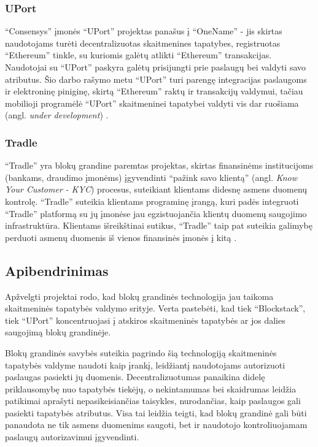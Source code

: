 \subsubsection{UPort}

\enquote{Consensys} įmonės \enquote{UPort} projektas panašus į \enquote{OneName} - jis skirtas naudotojams turėti decentralizuotas
skaitmenines tapatybes, registruotas \enquote{Ethereum} tinkle, su kuriomis galėtų atlikti \enquote{Ethereum} transakcijas.
Naudotojai su \enquote{UPort} paskyra
galėtų prisijungti prie paslaugų bei valdyti savo atributus. Šio darbo rašymo metu \enquote{UPort} turi
parengę integracijas paslaugoms ir elektroninę piniginę, skirtą \enquote{Ethereum} raktų
ir transakcijų valdymui, tačiau mobilioji programėlė \enquote{UPort} skaitmeninei tapatybei valdyti vis dar ruošiama (angl.
\textit{under development}) \cite{UPort}.

\subsubsection{Tradle}

\enquote{Tradle} yra blokų grandine paremtas projektas, skirtas finansinėms institucijoms (bankams,
draudimo įmonėms) įgyvendinti \enquote{pažink savo klientą} (angl. \textit{Know Your Customer - KYC}) procesus,
suteikiant klientams didesnę asmens duomenų kontrolę. \enquote{Tradle} suteikia
klientams programinę įrangą, kuri padės integruoti \enquote{Tradle} platformą su jų įmonėse jau egzistuojančia klientų duomenų saugojimo
infrastruktūra. Klientams išreikštinai sutikus, \enquote{Tradle} taip pat suteikia galimybę perduoti asmenų duomenis iš vienos
finansinės įmonės į kitą \cite{Baars2016}.

\subsection{Apibendrinimas}

Apžvelgti projektai rodo, kad blokų grandinės technologija jau taikoma skaitmeninės tapatybės valdymo srityje. Verta pastebėti,
kad tiek \enquote{Blockstack}, tiek \enquote{UPort} koncentruojasi į atskiros skaitmeninės tapatybės ar jos dalies saugojimą blokų grandinėje.

Blokų grandinės savybės suteikia pagrindo šią technologiją skaitmeninės tapatybės valdyme naudoti kaip įrankį,
leidžiantį naudotojams autorizuoti paslaugas pasiekti jų duomenis. Decentralizuotumas panaikina didelę
priklausomybę nuo tapatybės tiekėjų, o nekintamumas bei skaidrumas leidžia patikimai aprašyti nepasikeisiančias taisykles, nurodančias, kaip paslaugos gali pasiekti tapatybės atributus.
 Visa tai leidžia teigti, kad blokų grandinė gali būti panaudota
ne tik asmens duomenims saugoti, bet ir naudotojo kontroliuojamam paslaugų autorizavimui įgyvendinti. 